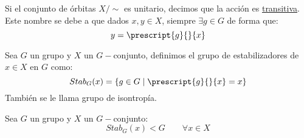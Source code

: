 \begin{definicion}
    Si el conjunto de órbitas $X/\sim$ es unitario, decimos que la acción es \underline{transitiva}.\\

    \noindent
    Este nombre se debe a que dados $x,y\in X$, siempre $\exists g\in G$ de forma que:
    \begin{equation*}
        y = \prescript{g}{}{x}
    \end{equation*}
\end{definicion}

\begin{definicion}[Estabilizador]
    Sea $G$ un grupo y $X$ un $G-$conjunto, definimos el grupo de estabilizadores de $x\in X$ en $G$ como:
    \begin{equation*}
        Stab_G(x) = \{g\in G \mid \prescript{g}{}{x} = x\}
    \end{equation*}
    También se le llama grupo de isontropía.
\end{definicion}

\begin{prop}
    Sea $G$ un grupo y $X$ un $G-$conjunto:
    \begin{equation*}
        Stab_G(x) < G \qquad \forall x\in X
    \end{equation*}
\end{prop}

